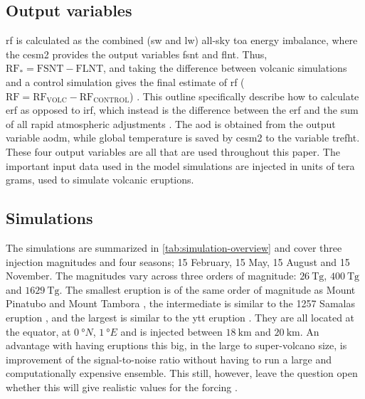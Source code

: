 \documentclass{ametsocV5}
\newcommand{\iso}[1][i]{{#1}njected \ce{SO2}}
\begin{document}
\subsection{Output variables}

\Ac{rf} is calculated as the combined (\ac{sw} and \ac{lw}) all-sky \ac{toa} energy
imbalance, where the \ac{cesm2} provides the output variables \ac{fsnt} and \ac{flnt}.
Thus, \(\mathrm{RF_*}= \mathrm{FSNT} - \mathrm{FLNT}\), and taking the difference
between volcanic simulations and a control simulation gives the final estimate of
\ac{rf} (\(\mathrm{RF}=\mathrm{RF_{VOLC}}-\mathrm{RF_{CONTROL}}\)) \citep{marshall2020}.
This outline specifically describe how to calculate \ac{erf} as opposed to \ac{irf},
which instead is the difference between the \ac{erf} and the sum of all rapid
atmospheric adjustments \citep{marshall2020,smith2018}. The \ac{aod} is obtained from
the output variable \ac{aodm}, while global temperature is saved by \ac{cesm2} to the
variable \ac{trefht}. These four output variables are all that are used throughout this
paper. The important input data used in the model simulations are \iso{} in units of
tera grams, used to simulate volcanic eruptions.

\subsection{Simulations}

The simulations are summarized in \cref{tab:simulation-overview} and cover three
 injection magnitudes and four seasons; 15 February, 15 May, 15 August and 15
November. The magnitudes vary across three orders of magnitude: \(\SI{26}{\tera\gram}\),
\(\SI{400}{\tera\gram}\) and \(\SI{1629}{\tera\gram}\). The smallest eruption is of the
same order of magnitude as Mount Pinatubo
\citep[\(\sim10\)--\(\SI{20}{\tera\gram}\);~e.g.][]{timmreck2018} and Mount Tambora
\citep[\(\sim\SI{56.2}{\tera\gram}\);~e.g.][]{zanchettin2016}, the intermediate is
similar to the 1257 Samalas eruption
\citep[\(\sim{119}\)--\(\SI{250}{\tera\gram}\);~e.g.][]{toohey2017,ottobliesner2016},
and the largest is similar to the \ac{ytt} eruption
\citep[\(100\)--\(\SI{10000}{\tera\gram}\);][and~references~therein]{jones2005}. They
are all located at the equator, at \(\SI{0}{\degree N}\), \(\SI{1}{\degree E}\) and
 is injected between \(\SI{18}{\kilo\meter}\) and \(\SI{20}{\kilo\meter}\). An
advantage with having eruptions this big, in the large to super-volcano size, is
improvement of the signal-to-noise ratio without having to run a large and
computationally expensive ensemble. This still, however, leave the question open whether
this will give realistic values for the forcing \citep{gregory2016}.
\end{document}
